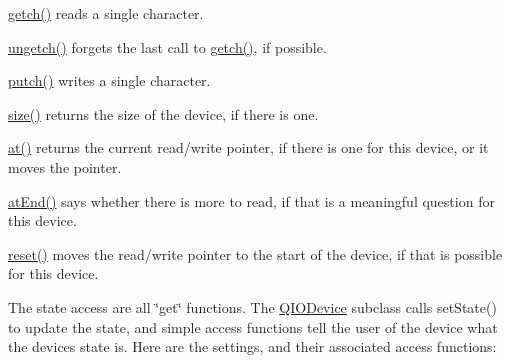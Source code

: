 \begin{DoxyItemize}
\item \mbox{\hyperlink{class_q_i_o_device_a7cef61d66023f9cda6b0912082bd19fc}{getch()}} reads a single character.


\item \mbox{\hyperlink{class_q_i_o_device_aae3d67422103e8fc0411297b1d62c29a}{ungetch()}} forgets the last call to \mbox{\hyperlink{class_q_i_o_device_a7cef61d66023f9cda6b0912082bd19fc}{getch()}}, if possible.


\item \mbox{\hyperlink{class_q_i_o_device_a5de5c1c1cba7ca36ba93289e30cd3029}{putch()}} writes a single character.


\item \mbox{\hyperlink{class_q_i_o_device_a60c4146763625213ac7aa29f1f071592}{size()}} returns the size of the device, if there is one.


\item \mbox{\hyperlink{class_q_i_o_device_a0dee1db4a9e506924ccac6982ffdf3df}{at()}} returns the current read/write pointer, if there is one for this device, or it moves the pointer.


\item \mbox{\hyperlink{class_q_i_o_device_ac5a3fcc9349a98d8f260039c5fd58812}{at\+End()}} says whether there is more to read, if that is a meaningful question for this device.


\item \mbox{\hyperlink{class_q_i_o_device_ac2f29866602352c08b3d3cb3f1fdc7e2}{reset()}} moves the read/write pointer to the start of the device, if that is possible for this device.


\end{DoxyItemize}The state access are all \char`\"{}get\char`\"{} functions. The \mbox{\hyperlink{class_q_i_o_device}{Q\+I\+O\+Device}} subclass calls set\+State() to update the state, and simple access functions tell the user of the device what the device\textquotesingle{}s state is. Here are the settings, and their associated access functions\+: 
